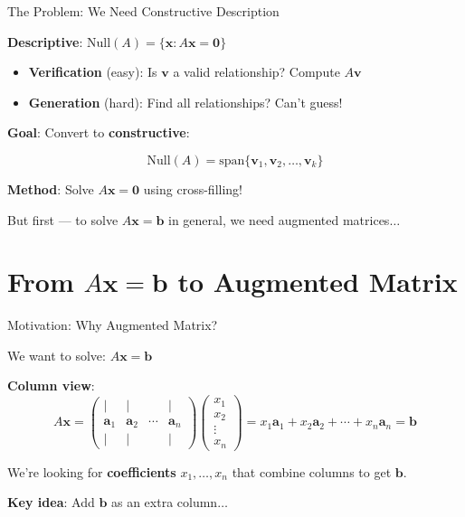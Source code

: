 \documentclass[10pt]{beamer}
\theoremstyle{definition}
\newcommand{\x}[1]{\alert{\textbf{#1}}}
\begin{document}
\begin{frame}{The Problem: We Need Constructive Description}

\x{Descriptive}: $\text{Null}(A) = \{\mathbf{x} : A\mathbf{x} = \mathbf{0}\}$

\begin{itemize}
\item \textbf{Verification} (easy): Is $\mathbf{v}$ a valid relationship? Compute $A\mathbf{v}$
\item \textbf{Generation} (hard): Find all relationships? Can't guess!
\end{itemize}

\vspace{1em}

\x{Goal}: Convert to \textbf{constructive}:

$$\text{Null}(A) = \text{span}\{\mathbf{v}_1, \mathbf{v}_2, \ldots, \mathbf{v}_k\}$$

\vspace{0.5em}

\x{Method}: Solve $A\mathbf{x} = \mathbf{0}$ using cross-filling!

\vspace{0.5em}

But first — to solve $A\mathbf{x} = \mathbf{b}$ in general, we need augmented matrices$\ldots$

\end{frame}

\section{From $A\mathbf{x} = \mathbf{b}$ to Augmented Matrix}

\begin{frame}{Motivation: Why Augmented Matrix?}

We want to solve: $A\mathbf{x} = \mathbf{b}$

\vspace{1em}

\x{Column view}:
$$A\mathbf{x} = \begin{pmatrix} | & | & & | \\ \mathbf{a}_1 & \mathbf{a}_2 & \cdots & \mathbf{a}_n \\ | & | & & | \end{pmatrix} \begin{pmatrix} x_1 \\ x_2 \\ \vdots \\ x_n \end{pmatrix} = x_1\mathbf{a}_1 + x_2\mathbf{a}_2 + \cdots + x_n\mathbf{a}_n = \mathbf{b}$$

\vspace{0.5em}

We're looking for \x{coefficients} $x_1, \ldots, x_n$ that combine columns to get $\mathbf{b}$.

\vspace{1em}

\x{Key idea}: Add $\mathbf{b}$ as an extra column$\ldots$

\end{frame}
\end{document}

